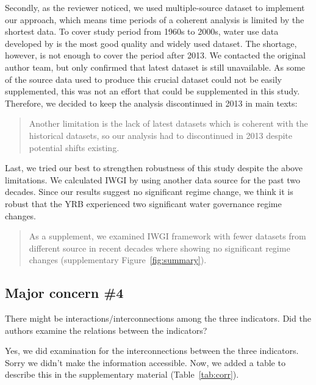 \AR*{} Secondly, as the reviewer noticed, we used multiple-source dataset to implement our approach, which means time periods of a coherent analysis is limited by the shortest data. To cover study period from 1960s to 2000s, water use data developed by  is the most good quality and widely used dataset. The shortage, however, is not enough to cover the period after 2013. We contacted the original author team, but only confirmed that latest dataset is still unavailable. As some of the source data used to produce this crucial dataset could not be easily supplemented, this was not an effort that could be supplemented in this study. Therefore, we decided to keep the analysis discontinued in 2013 in main texts:

\begin{quote}
	Another limitation is the lack of latest datasets which is coherent with the historical datasets, so our analysis had to discontinued in 2013 despite potential shifts existing.
\end{quote}

\AR*{} Last, we tried our best to strengthen robustness of this study despite the above limitations. We calculated IWGI by using another data source for the past two decades. Since our results suggest no significant regime change, we think it is robust that the YRB experienced two significant water governance regime changes.

\begin{quote}
	As a supplement, we examined IWGI framework with fewer datasets from different source in recent decades where showing no significant regime changes (supplementary Figure~\ref{fig:summary}).  %
\end{quote}

\subsection{Major concern \#4}
\RC{} There might be interactions/interconnections among the three indicators. Did the authors examine the relations between the indicators?

\AR{} Yes, we did examination for the interconnections between the three indicators. Sorry we didn't make the information accessible. Now, we added a table to describe this in the supplementary material (Table~\ref{tab:corr}).



